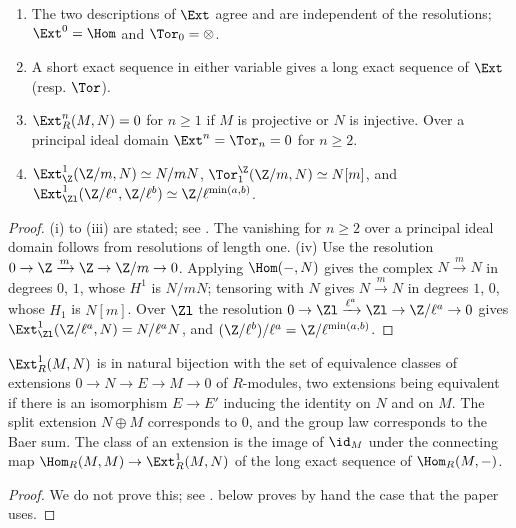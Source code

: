 \begin{proposition}\label{prop:cohomology:ext-tor}
\begin{enumerate}[label=(\roman*)]
\item The two descriptions of $\Ext$ agree and are independent of the resolutions; $\Ext^0=\Hom$ and $\Tor_0=\otimes$.
\item A short exact sequence in either variable gives a long exact sequence of $\Ext$ (resp. $\Tor$).
\item $\Ext^n_R(M,N)=0$ for $n\ge1$ if $M$ is projective or $N$ is injective. Over a principal ideal domain $\Ext^n=\Tor_n=0$ for $n\ge2$.
\item $\Ext^1_\Z(\Z/m,N)\simeq N/mN$, $\Tor_1^\Z(\Z/m,N)\simeq N[m]$, and $\Ext^1_{\Zl}(\Z/\ell^a,\Z/\ell^b)\simeq\Z/\ell^{\min(a,b)}$.
\end{enumerate}
\end{proposition}

\begin{proof}
(i) to (iii) are stated; see \cite[Sections 2.4 to 2.7 and 3.1 to 3.3]{Weibel}. The vanishing for $n\ge2$ over a principal ideal domain follows from
resolutions of length one. (iv) Use the resolution $0\to\Z\xrightarrow{m}\Z\to\Z/m\to0$. Applying $\Hom(-,N)$ gives the complex
$N\xrightarrow{m}N$ in degrees $0$, $1$, whose $H^1$ is $N/mN$; tensoring with $N$ gives $N\xrightarrow{m}N$ in degrees $1$, $0$, whose $H_1$ is $N[m]$. Over
$\Zl$ the resolution $0\to\Zl\xrightarrow{\ell^a}\Zl\to\Z/\ell^a\to0$ gives $\Ext^1_{\Zl}(\Z/\ell^a,N)=N/\ell^aN$, and $(\Z/\ell^b)/\ell^a=\Z/\ell^{\min(a,b)}$.
\end{proof}

\begin{theorem}\label{thm:cohomology:ext1}
$\Ext^1_R(M,N)$ is in natural bijection with the set of equivalence classes of extensions $0\to N\to E\to M\to0$ of $R$-modules, two extensions being
equivalent if there is an isomorphism $E\to E'$ inducing the identity on $N$ and on $M$. The split extension $N\oplus M$ corresponds to $0$, and the
group law corresponds to the Baer sum. The class of an extension is the image of $\id_M$ under the connecting map $\Hom_R(M,M)\to\Ext^1_R(M,N)$ of the
long exact sequence of $\Hom_R(M,-)$.
\end{theorem}

\begin{proof}
We do not prove this; see \cite[Section 3.4]{Weibel}.  below proves by hand the case that the paper uses.
\end{proof}

